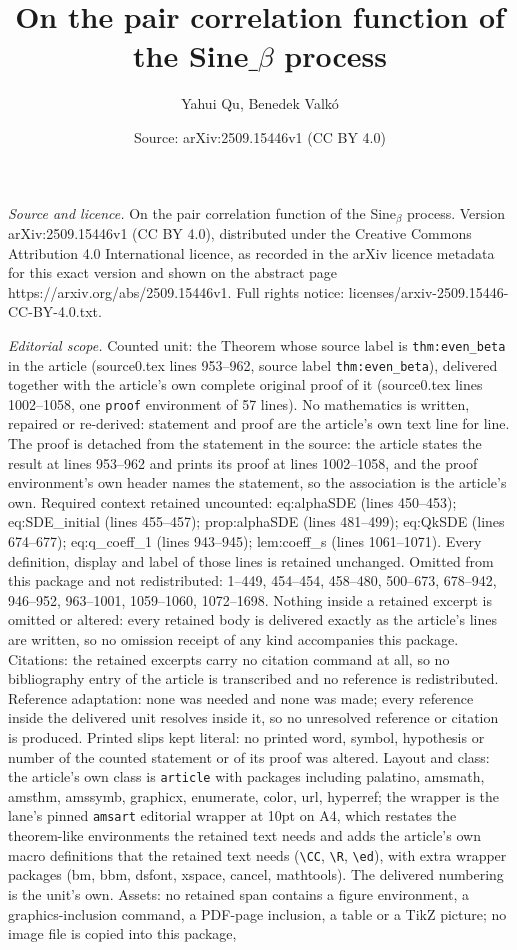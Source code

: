 \documentclass[10pt,a4paper]{amsart}
\title[On the pair correlation function of the Sine$\_\beta$ process]{On the pair correlation function of the Sine$\_\beta$ process}
\author{Yahui Qu, Benedek Valk\'o}
\date{Source: arXiv:2509.15446v1 (CC BY 4.0)}
\begin{document}
\maketitle

\noindent\emph{Source and licence.} On the pair correlation function of the Sine$_\beta$ process. Version arXiv:2509.15446v1 (CC BY 4.0), distributed under the Creative Commons Attribution 4.0 International licence, as recorded in the arXiv licence metadata for this exact version and shown on the abstract page https://arxiv.org/abs/2509.15446v1. Full rights notice: licenses/arxiv-2509.15446-CC-BY-4.0.txt.\par\smallskip

\noindent\textit{Editorial scope.} Counted unit: the Theorem whose source label is \texttt{thm:even\_beta} in the article (source0.tex lines 953--962, source label \texttt{thm:even\_beta}), delivered together with the article's own complete original proof of it (source0.tex lines 1002--1058, one \texttt{proof} environment of 57 lines). No mathematics is written, repaired or re-derived: statement and proof are the article's own text line for line. The proof is detached from the statement in the source: the article states the result at lines 953--962 and prints its proof at lines 1002--1058, and the proof environment's own header names the statement, so the association is the article's own. Required context retained uncounted: eq:alphaSDE (lines 450--453); eq:SDE\_initial (lines 455--457); prop:alphaSDE (lines 481--499); eq:QkSDE (lines 674--677); eq:q\_coeff\_1 (lines 943--945); lem:coeff\_s (lines 1061--1071). Every definition, display and label of those lines is retained unchanged. Omitted from this package and not redistributed: 1--449, 454--454, 458--480, 500--673, 678--942, 946--952, 963--1001, 1059--1060, 1072--1698. Nothing inside a retained excerpt is omitted or altered: every retained body is delivered exactly as the article's lines are written, so no omission receipt of any kind accompanies this package. Citations: the retained excerpts carry no citation command at all, so no bibliography entry of the article is transcribed and no reference is redistributed. Reference adaptation: none was needed and none was made; every reference inside the delivered unit resolves inside it, so no unresolved reference or citation is produced. Printed slips kept literal: no printed word, symbol, hypothesis or number of the counted statement or of its proof was altered. Layout and class: the article's own class is \texttt{article} with packages including palatino, amsmath, amsthm, amssymb, graphicx, enumerate, color, url, hyperref; the wrapper is the lane's pinned \texttt{amsart} editorial wrapper at 10pt on A4, which restates the theorem-like environments the retained text needs and adds the article's own macro definitions that the retained text needs (\texttt{\textbackslash CC}, \texttt{\textbackslash R}, \texttt{\textbackslash ed}), with extra wrapper packages (bm, bbm, dsfont, xspace, cancel, mathtools). The delivered numbering is the unit's own. Assets: no retained span contains a figure environment, a graphics-inclusion command, a PDF-page inclusion, a table or a TikZ picture; no image file is copied into this package, 
\end{document}
